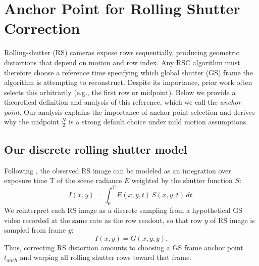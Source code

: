 
\section{Anchor Point for Rolling Shutter Correction}
\label{sec:Anchor_Point}
Rolling-shutter (RS) cameras expose rows sequentially, producing geometric distortions that depend on motion and row index. Any RSC algorithm must therefore choose a reference time specifying which global shutter (GS) frame the algorithm is attempting to reconstruct. Despite its importance, prior work often selects this arbitrarily (e.g., the first row or midpoint). Below we provide a theoretical definition and analysis of this reference, which we call the \textit{anchor point}. Our analysis explains the importance of anchor point selection and derives why the midpoint $\frac{N}{2}$ is a strong default choice under mild motion assumptions. 

    
    


\subsection{Our discrete rolling shutter model}
Following \cite{Coded-RS}, the observed RS image can be modeled as an integration over exposure time T of the scene radiance $E$ weighted by the shutter function $S$:
\begin{equation}
    I(x, y) = \int_{0}^{T} E(x,y,t)\, S(x,y,t)\, dt. \label{eqn:eqn1}
\end{equation} 
We reinterpret each RS image as a discrete sampling from a hypothetical GS video recorded at the same rate as the row readout, so that row $y$ of RS image is sampled from frame $y$:
\begin{equation}
I(x, y) = G(x, y, y). \label{eqn:eqn2}
\end{equation}
{Thus, correcting RS distortion amounts to choosing a GS frame anchor point $t_{anch}$ and warping all rolling shutter rows toward that frame.}

